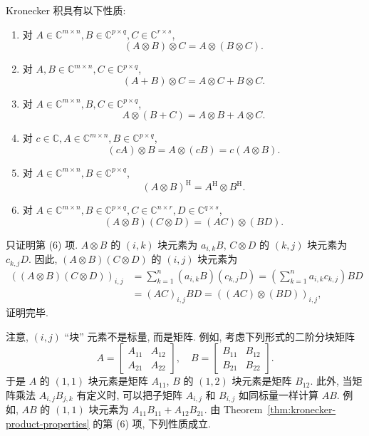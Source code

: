 \begin{Theorem}\label{thm:kronecker-product-properties}
{Kronecker 积具有以下性质:}
\begin{enumerate}
\item {对 $A\in\mathbb{C}^{m\times n},B\in\mathbb{C}^{p\times q},C\in\mathbb{C}^{r\times s}$,}
\[(A\otimes B)\otimes C=A\otimes(B\otimes C).\]
\item {对 $A,B\in\mathbb{C}^{m\times n},C\in\mathbb{C}^{p\times q}$,}
\[(A+B)\otimes C=A\otimes C+B\otimes C.\]
\item {对 $A\in\mathbb{C}^{m\times n},B,C\in\mathbb{C}^{p\times q}$,}
\[A\otimes(B+C)=A\otimes B+A\otimes C.\]
\item {对 $c\in\mathbb{C},A\in\mathbb{C}^{m\times n},B\in\mathbb{C}^{p\times q}$,}
\[(cA)\otimes B=A\otimes(cB)=c(A\otimes B).\]
\item {对 $A\in\mathbb{C}^{m\times n},B\in\mathbb{C}^{p\times q}$,}
\[(A\otimes B)^{\mathrm H}=A^{\mathrm H}\otimes B^{\mathrm H}.\]
\item {对 $A\in\mathbb{C}^{m\times n},B\in\mathbb{C}^{p\times q},C\in\mathbb{C}^{n\times r},D\in\mathbb{C}^{q\times s}$,}
\[(A\otimes B)(C\otimes D)=(AC)\otimes(BD).\]
\end{enumerate}
\end{Theorem}
\begin{Proof}
{只证明第 (6) 项. $A\otimes B$ 的 $(i,k)$ 块元素为 $a_{i,k}B$, $C\otimes D$ 的 $(k,j)$ 块元素为 $c_{k,j}D$. 因此, $(A\otimes B)(C\otimes D)$ 的 $(i,j)$ 块元素为}
\[\begin{aligned}
((A\otimes B)(C\otimes D))_{i,j}&=\sum_{k=1}^n(a_{i,k}B)(c_{k,j}D)=\left(\sum_{k=1}^na_{i,k}c_{k,j}\right)BD\\
&=(AC)_{i,j}BD=((AC)\otimes(BD))_{i,j},
\end{aligned}\]
{证明完毕.}
\end{Proof}
{注意, $(i,j)$ ``块'' 元素不是标量, 而是矩阵. 例如, 考虑下列形式的二阶分块矩阵}
\[A=\begin{bmatrix}A_{11}&A_{12}\\A_{21}&A_{22}\end{bmatrix},\quad B=\begin{bmatrix}B_{11}&B_{12}\\B_{21}&B_{22}\end{bmatrix}.\]
{于是 $A$ 的 $(1,1)$ 块元素是矩阵 $A_{11}$, $B$ 的 $(1,2)$ 块元素是矩阵 $B_{12}$. 此外, 当矩阵乘法 $A_{i,j}B_{j,k}$ 有定义时, 可以把子矩阵 $A_{i,j}$ 和 $B_{i,j}$ 如同标量一样计算 $AB$. 例如, $AB$ 的 $(1,1)$ 块元素为 $A_{11}B_{11}+A_{12}B_{21}$. 由 Theorem\ \ref{thm:kronecker-product-properties} 的第 (6) 项, 下列性质成立.}
